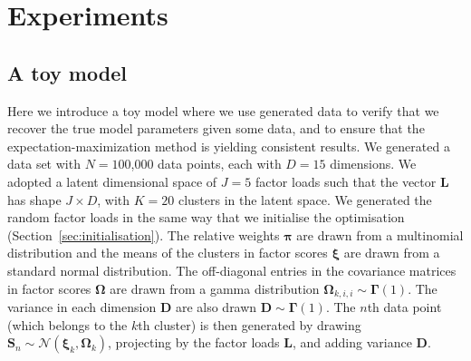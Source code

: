 \documentclass[twocolumn]{aastex62}
\newcommand{\vect}[1]{\boldsymbol{\mathbf{#1}}}
\renewcommand{\vec}[1]{\vect{#1}}
\newcommand{\weight}{\pi}
\newcommand{\factorloads}{\textbf{L}}
\newcommand{\factorscores}{\textbf{S}}
\newcommand{\specificvariance}{\vec{D}}
\newcommand{\scoremeans}{\vec\xi}
\newcommand{\scorecovs}{\vec\Omega}
\newcommand{\NumData}{N}
\newcommand{\NumDimensions}{D}
\newcommand{\numdata}{n}
\newcommand{\NumLatentFactors}{J}
\newcommand{\NumComponents}{K}
\newcommand{\numcomponents}{k}
\begin{document}

\section{Experiments} \label{sec:experiments}


\subsection{A toy model} \label{sec:exp-1}

Here we introduce a toy model where we use generated data to verify that
we recover the true model parameters given some data, and to
ensure that the expectation-maximization method is yielding consistent results.
We generated a data set with ${\NumData = 1}$00,000 data points, each with
$\NumDimensions = 15$ dimensions. We adopted a latent dimensional space of 
$\NumLatentFactors = 5$ factor loads such that the vector $\factorloads$ has
shape $\NumLatentFactors \times \NumDimensions$,
with $\NumComponents = 20$ clusters in the latent space. 
We generated the random factor loads in the same way that we initialise the optimisation (Section~\ref{sec:initialisation}). The relative weights $\vec\weight$
are drawn from a multinomial distribution and the means of the clusters
in factor scores $\scoremeans$ are drawn from a standard normal
distribution. The off-diagonal entries in the covariance matrices in factor scores $\scorecovs$ are drawn from a gamma distribution $\scorecovs_{\numcomponents,i,i} \sim \vec\Gamma\left(1\right)$. The variance in 
each dimension $\specificvariance$ are also drawn $\specificvariance \sim \vec\Gamma\left(1\right)$.
The $\numdata$th data point (which belongs to the $\numcomponents$th cluster) is then
generated by drawing $\factorscores_{\numdata} \sim \mathcal{N}(\scoremeans_\numcomponents,\scorecovs_\numcomponents)$, projecting by the factor loads $\factorloads$, and adding variance $\specificvariance$.





\end{document}
